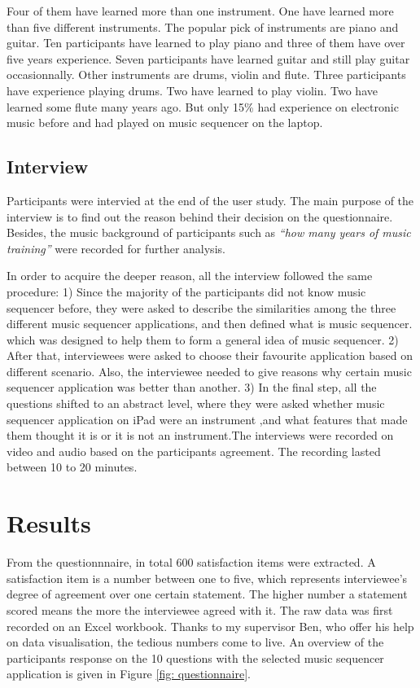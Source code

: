 Four of them have learned more than one instrument. One have learned more than five different instruments. The popular pick of instruments are piano and guitar. Ten participants have learned to play piano and three of them have over five years experience. Seven participants have learned guitar and still play guitar occasionnally. Other instruments are drums, violin and flute. Three participants have experience playing drums. Two have learned to play violin. Two have learned some flute many years ago. But only 15\% had experience on electronic music before and had played on music sequencer on the laptop.

\subsection{Interview}

Participants were intervied at the end of the user study. The main purpose of the interview is to find out the reason behind their decision on the questionnaire. Besides, the music background of participants such as \textit{\textquotedblleft{how many years of music training}\textquotedblright} were recorded for further analysis.

In order to acquire the deeper reason, all the interview followed the same procedure: 1) Since the majority of the participants did not know music sequencer before, they were asked to describe the similarities among the three different music sequencer applications, and then defined what is music sequencer. which was designed to help them to form a general idea of music sequencer. 2) After that, interviewees were asked to choose their favourite application based on different scenario. Also, the interviewee needed to give reasons why certain music sequencer application was better than another. 3) In the final step, all the questions shifted to an abstract level, where they were asked whether music sequencer application on iPad were an instrument ,and what features that made them thought it is or it is not an instrument.The interviews were recorded on video and audio based on the participants agreement. The recording lasted between 10 to 20 minutes.

\section{Results}

From the questionnnaire, in total 600 satisfaction items were extracted. A satisfaction item is a number between one to five, which represents interviewee's degree of agreement over one certain statement. The higher number a statement scored means the more the interviewee agreed with it. The raw data was first recorded on an Excel workbook. Thanks to my supervisor Ben, who offer his help on data visualisation, the tedious numbers come to live. An overview of the participants response on the 10 questions with the selected music sequencer application is given in Figure \ref{fig: questionnaire}.


